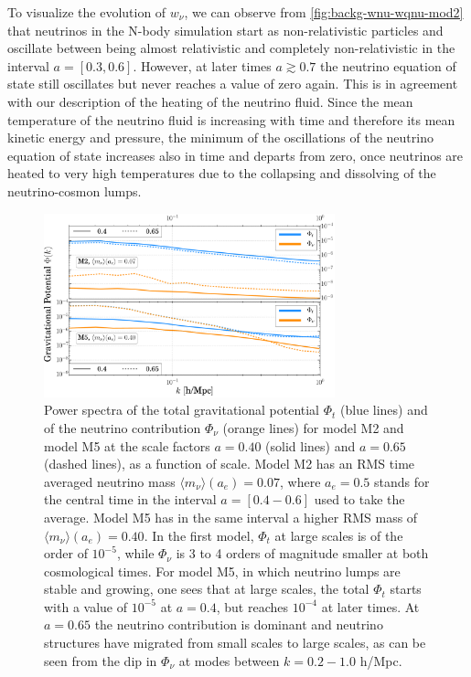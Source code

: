To visualize the evolution of $w_{\nu}$, we can observe from \cref{fig:backg-wnu-wqnu-mod2}
that neutrinos in the N-body simulation start as non-relativistic
particles and oscillate between being almost relativistic and completely
non-relativistic in the interval $a=[0.3,0.6]$. However, at later
times $a\gtrsim0.7$ the neutrino equation of state still oscillates
but never reaches a value of zero again. This is in agreement with
our description of the heating of the neutrino fluid. Since the mean
temperature of the neutrino fluid is increasing with time and therefore
its mean kinetic energy and pressure, the minimum of the oscillations
of the neutrino equation of state increases also in time and departs
from zero, once neutrinos are heated to very high temperatures due
to the collapsing and dissolving of the neutrino-cosmon lumps.

\begin{figure}
\centering{}\includegraphics[width=0.75\textwidth]{Chapters/gnq/figures/Phi-GravPotSpec-M2-and-M5-at-006500-Phit_Phinu-new}
\caption[Gravitational potential $\Phi$ for models of GNQ.]{\label{fig:gravpot-in-scale} Power spectra of the total gravitational
potential $\Phi_{t}$ (blue lines) and of the neutrino contribution
$\Phi_{\nu}$ (orange lines) for model M2 and model M5 at the scale
factors $a=0.40$ (solid lines) and $a=0.65$ (dashed lines), as a
function of scale. Model M2 has an RMS time averaged neutrino mass
$\langle m_{\nu}\rangle(a_{e})=0.07$, where $a_{e}=0.5$ stands for
the central time in the interval $a=[0.4-0.6]$ used to take the average.
Model M5 has in the same interval a higher RMS mass of $\langle m_{\nu}\rangle(a_{e})=0.40$.
In the first model, $\Phi_{t}$ at large scales is of the order of
$10^{-5}$, while $\Phi_{\nu}$ is 3 to 4 orders of magnitude smaller
at both cosmological times. For model M5, in which neutrino lumps
are stable and growing, one sees that at large scales, the total $\Phi_{t}$
starts with a value of $10^{-5}$ at $a=0.4$, but reaches $10^{-4}$
at later times. At $a=0.65$ the neutrino contribution is dominant
and neutrino structures have migrated from small scales to large scales,
as can be seen from the dip in $\Phi_{\nu}$ at modes between $k=0.2-1.0$
h/Mpc.}
\end{figure}



